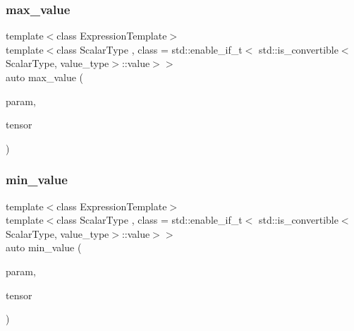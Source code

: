 \mbox{\label{classbc_1_1tensors_1_1Expression__Base_a134cc79c65e313ff471ccbd1c4cff50f}} 
\subsubsection{\texorpdfstring{max\+\_\+value}{max\_value}}
{\footnotesize\ttfamily template$<$class Expression\+Template$>$ \\
template$<$class Scalar\+Type , class  = std\+::enable\+\_\+if\+\_\+t$<$   std\+::is\+\_\+convertible$<$\+Scalar\+Type, value\+\_\+type$>$\+::value$>$$>$ \\
auto max\+\_\+value (\begin{DoxyParamCaption}\item[{const Scalar\+Type \&}]{param,  }\item[{const \hyperlink{classbc_1_1tensors_1_1Expression__Base}{Expression\+\_\+\+Base}$<$ Expression\+Template $>$ \&}]{tensor }\end{DoxyParamCaption})\hspace{0.3cm}{\ttfamily [friend]}}

\mbox{\label{classbc_1_1tensors_1_1Expression__Base_ad0cc0e8e0904d59a9e73538bf0c680d2}} 
\subsubsection{\texorpdfstring{min\+\_\+value}{min\_value}}
{\footnotesize\ttfamily template$<$class Expression\+Template$>$ \\
template$<$class Scalar\+Type , class  = std\+::enable\+\_\+if\+\_\+t$<$   std\+::is\+\_\+convertible$<$\+Scalar\+Type, value\+\_\+type$>$\+::value$>$$>$ \\
auto min\+\_\+value (\begin{DoxyParamCaption}\item[{const Scalar\+Type \&}]{param,  }\item[{const \hyperlink{classbc_1_1tensors_1_1Expression__Base}{Expression\+\_\+\+Base}$<$ Expression\+Template $>$ \&}]{tensor }\end{DoxyParamCaption})\hspace{0.3cm}{\ttfamily [friend]}}

